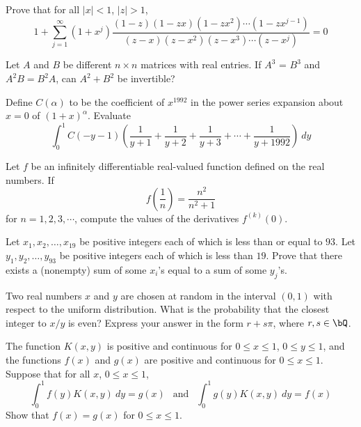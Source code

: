 \documentclass[12pt]{article}
\begin{document}
    \begin{exercise}[1990 B2]
        Prove that for all $|x|<1$, $|z|>1$, 
        \[1+\sum_{j=1}^\infty (1+x^j)\frac{(1-z)(1-zx)(1-zx^2)\cdots(1-zx^{j-1})}{(z-x)(z-x^2)(z-x^3)\cdots(z-x^j)} = 0\]
    \end{exercise}

    \begin{exercise}[1991 A2]
        Let $A$ and $B$ be different $n \times n$ matrices with real entries. If $A^{3}$ = $B^{3}$ and $A^{2}B = B^{2}A$, can $A^{2} + B^{2}$ be invertible?
    \end{exercise}

    \begin{exercise}[1992 A2]
        Define $C(\alpha)$ to be the coefficient of $x^{1992}$ in the power series expansion about $x=0$ of $(1+x)^\alpha$. Evaluate
        \[\int_0^1 C(-y-1)\left(\frac{1}{y+1}+\frac{1}{y+2}+\frac{1}{y+3}+\cdots + \frac{1}{y+1992}\right)\ dy\]
    \end{exercise}

    \begin{exercise}[1992 A4]
        Let $f$ be an infinitely differentiable real-valued function defined on the real numbers. If \[f\left(\frac{1}{n}\right) =\frac{n^2}{n^2+1}\] for $n=1,2,3,\cdots$, compute the values of the derivatives $f^{(k)}(0)$.
    \end{exercise}

    \begin{exercise}[1993 A4]
        Let $x_1,x_2,\dots,x_{19}$ be positive integers each of which is less than or equal to $93$. Let $y_1,y_2,\dots,y_{93}$ be positive integers each of which is less than $19$. Prove that there exists a (nonempty) sum of some $x_{i}$'s equal to a sum of some $y_j$'s.
    \end{exercise}

    \begin{exercise}[1993 B3]
        Two real numbers \(x\) and \(y\) are chosen at random in the interval \((0,1)\) with respect to the uniform distribution.
        What is the probability that the closest integer to \(x/y\) is even? 
        Express your answer in the form \(r+s\pi\), where \(r,s\in\bQ\).
    \end{exercise}

    \begin{exercise}[1993 B4]
        The function $K(x,y)$ is positive and continuous for $0\leqslant x \leqslant 1$, $0\leqslant y \leqslant 1$, and the functions $f(x)$ and $g(x)$ are positive and continuous for $0\leqslant x \leqslant 1$. Suppose that for all $x$, $0\leqslant x \leqslant 1$,
        \[\int_0^1f(y)K(x,y)\ dy = g(x)\ \ \text{ and }\ \ \int_0^1 g(y)K(x,y)\ dy = f(x)\] Show that $f(x)=g(x)$ for $0\leqslant x \leqslant 1$. 
    \end{exercise}
        
\end{document}
